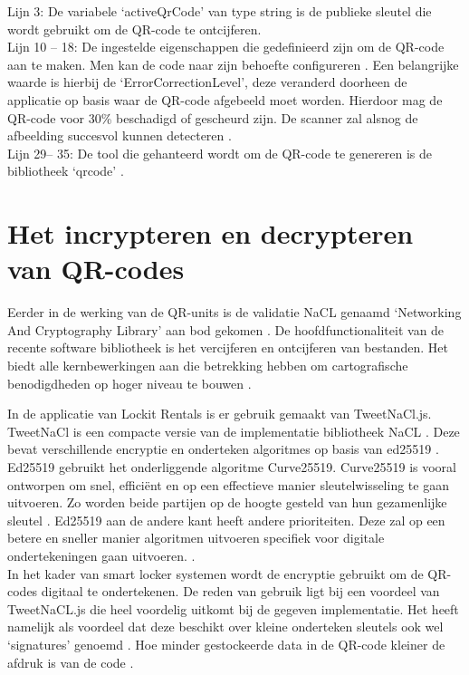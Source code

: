 Lijn 3: De variabele ‘activeQrCode’ van type string is de publieke sleutel die wordt gebruikt om de QR-code te ontcijferen. \\
Lijn 10 – 18: De ingestelde eigenschappen die gedefinieerd zijn om de QR-code aan te maken. Men kan de code naar zijn behoefte configureren \autocite{Sutheebanjard2010}. Een belangrijke waarde is hierbij de ‘ErrorCorrectionLevel’, deze veranderd doorheen de applicatie op basis waar de QR-code afgebeeld moet worden. Hierdoor mag de QR-code voor 30\% beschadigd of gescheurd zijn. De scanner zal alsnog de afbeelding succesvol kunnen detecteren \autocite{Tiwari2016}. \\
Lijn 29– 35: De tool die gehanteerd wordt om de QR-code te genereren is de bibliotheek ‘qrcode’ \autocite{pypi2023}. 

\newpage
\section{Het incrypteren en decrypteren van QR-codes}%
\label{sec:encryptQR-code}

Eerder in de werking van de QR-units is de validatie NaCL genaamd ‘Networking And Cryptography Library’ aan bod gekomen \autocite{Bernstein}. De hoofdfunctionaliteit van de recente software bibliotheek is het vercijferen en ontcijferen van bestanden. Het biedt alle kernbewerkingen aan die betrekking hebben om cartografische benodigdheden op hoger niveau te bouwen \autocite{Bernsteina}.

In de applicatie van Lockit Rentals is er gebruik gemaakt van TweetNaCl.js. TweetNaCl is een compacte versie van de implementatie bibliotheek NaCL \autocite{Bernstein2014} \autocite{Bernsteinb}. Deze bevat verschillende encryptie en onderteken algoritmes op basis van ed25519 \autocite{Bernstein2011}. \\
Ed25519 gebruikt het onderliggende algoritme Curve25519. Curve25519 is vooral ontworpen om snel, efficiënt en op een effectieve manier sleutelwisseling te gaan uitvoeren. Zo worden beide partijen op de hoogte gesteld van hun gezamenlijke sleutel \autocite{Bernstein2006}. Ed25519 aan de andere kant heeft andere prioriteiten. Deze zal op een betere en sneller manier algoritmen uitvoeren specifiek voor digitale ondertekeningen gaan uitvoeren. \autocite{Bernstein2011}. \\
In het kader van smart locker systemen wordt de encryptie gebruikt om de QR-codes digitaal te ondertekenen. De reden van gebruik ligt bij een voordeel van TweetNaCL.js die heel voordelig uitkomt bij de gegeven implementatie. Het heeft namelijk als voordeel dat deze beschikt over kleine onderteken sleutels ook wel ‘signatures’ genoemd \autocite{Bernstein2011}. Hoe minder gestockeerde data in de QR-code kleiner de afdruk is van de code \autocite{Chow2016}.

